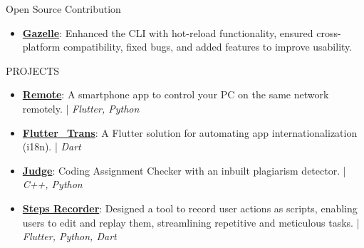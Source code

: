 \documentclass{resume} %
\begin{document}
\begin{rSection}{Open Source Contribution}
   \begin{itemize}
      \item     \textbf{\href{https://docs.gazelle-dart.dev/}{Gazelle}}: Enhanced the CLI with hot-reload functionality, ensured cross-platform compatibility, fixed bugs, and added features to improve usability.
   \end{itemize}

\end{rSection}


\begin{rSection}{PROJECTS}
   \begin{itemize}
      \item \textbf{\href{https://github.com/ShivanshuKGupta/remote}{Remote}}: A smartphone app to control your PC on the same network remotely. | \textit{Flutter, Python}
      \item \textbf{\href{https://pub.dev/packages/fluttertrans}{Flutter\_Trans}}: A Flutter solution for automating app internationalization (i18n). | \textit{Dart}
      \item \textbf{\href{https://github.com/ShivanshuKGupta/Judge}{Judge}}: Coding Assignment Checker with an inbuilt plagiarism detector. | \textit{C++, Python}
      \item \textbf{\href{https://github.com/ShivanshuKGupta/Steps-Recorder}{Steps Recorder}}: Designed a tool to record user actions as scripts, enabling users to edit and replay them, streamlining repetitive and meticulous tasks. | \textit{Flutter, Python, Dart}
   \end{itemize}
\end{rSection}
\end{document}
